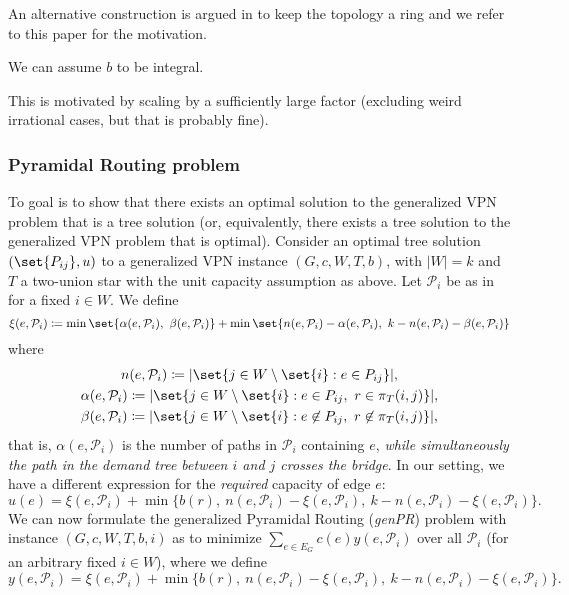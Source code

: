 An alternative construction is argued in \cite{grandoni2008short} to keep the topology a ring and we refer to this paper for the motivation.

\begin{fact}
    We can assume $b$ to be integral.
\end{fact}
This is motivated by scaling by a sufficiently large factor (excluding weird irrational cases, but that is probably fine).

\subsubsection{Pyramidal Routing problem}
To goal is to show that there exists an optimal solution to the generalized VPN problem that is a tree solution (or, equivalently, there exists a tree solution to the generalized VPN problem that is optimal).
Consider an optimal tree solution $(\set{P_{ij}}, u)$ to a generalized VPN instance $(G, c, W, T, b)$, with $|W| = k$ and $T$ a two-union star with the unit capacity assumption as above.
Let $\mathcal P_i$ be as in \cite{grandoni2008short} for a fixed $i \in W$.
We define
\[
    \xi(e, \mathcal P_i) \coloneqq \min\set{\alpha(e, \mathcal P_i),\ \beta(e, \mathcal P_i)} + \min\set{n(e, \mathcal P_i) - \alpha(e, \mathcal P_i),\ k - n(e, \mathcal P_i) - \beta(e, \mathcal P_i)}
\]
where
\begin{gather*}
    n(e, \mathcal P_i) \coloneqq |\set{j \in W \setminus \set{i} : e \in P_{ij}}|,\\
    \alpha(e, \mathcal P_i) \coloneqq |\set{j \in W \setminus \set{i} : e \in P_{ij},\ r \in \pi_T(i, j)}|,\\
    \beta(e, \mathcal P_i) \coloneqq |\set{j \in W \setminus \set{i} : e \not\in P_{ij},\ r \not\in \pi_T(i, j)}|,
\end{gather*}
that is, $\alpha(e, \mathcal P_i)$ is the number of paths in $\mathcal P_i$ containing $e$, \emph{while simultaneously the path in the demand tree between $i$ and $j$ crosses the bridge}.
In our setting, we have a different expression for the \emph{required} capacity of edge $e$:
\[
    u(e) = \xi(e, \mathcal P_i) + \min\Big\{b(r),\ n(e, \mathcal P_i) - \xi(e, \mathcal P_i),\ k - n(e, \mathcal P_i) -  \xi(e, \mathcal P_i)\Big\}.
\]
We can now formulate the generalized Pyramidal Routing (\emph{genPR}) problem with instance $(G, c, W, T, b, i)$ as to minimize $\sum_{e \in E_G} c(e) y(e, \mathcal P_i)$ over all $\mathcal P_i$ (for an arbitrary fixed $i \in W$), where we define
\[
    y(e, \mathcal P_i) = \xi(e, \mathcal P_i) + \min\Big\{b(r),\ n(e, \mathcal P_i) - \xi(e, \mathcal P_i),\ k - n(e, \mathcal P_i) -  \xi(e, \mathcal P_i)\Big\}.
\]


